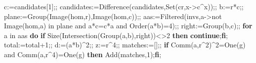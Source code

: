 \documentclass[
  10pt,
  letterpaper,
]{article}
\newenvironment{Shaded}{}{}
\newcommand{\BuiltInTok}[1]{\textcolor[rgb]{0.00,0.50,0.00}{#1}}
\newcommand{\ConstantTok}[1]{\textcolor[rgb]{0.53,0.00,0.00}{#1}}
\newcommand{\ControlFlowTok}[1]{\textcolor[rgb]{0.00,0.44,0.13}{\textbf{#1}}}
\newcommand{\ExtensionTok}[1]{#1}
\newcommand{\FloatTok}[1]{\textcolor[rgb]{0.25,0.63,0.44}{#1}}
\newcommand{\NormalTok}[1]{#1}
\newcommand{\OperatorTok}[1]{\textcolor[rgb]{0.40,0.40,0.40}{#1}}
\newcommand{\VariableTok}[1]{\textcolor[rgb]{0.10,0.09,0.49}{#1}}
\begin{document}
\begin{Shaded}
\begin{Highlighting}[]
   \VariableTok{c}\OperatorTok{:=}\VariableTok{candidates}\NormalTok{[}\FloatTok{1}\NormalTok{]}\OperatorTok{;;}
   \VariableTok{candidates}\OperatorTok{:=}\BuiltInTok{Difference}\NormalTok{(}\VariableTok{candidates}\OperatorTok{,}\BuiltInTok{Set}\NormalTok{(}\VariableTok{cr}\OperatorTok{,}\VariableTok{x}\OperatorTok{{-}\textgreater{}}\VariableTok{c}\OperatorTok{\^{}}\VariableTok{x}\NormalTok{))}\OperatorTok{;;}
   \VariableTok{b}\OperatorTok{:=}\VariableTok{r}\OperatorTok{*}\VariableTok{c}\OperatorTok{;;} \VariableTok{plane}\OperatorTok{:=}\BuiltInTok{Group}\NormalTok{(}\BuiltInTok{Image}\NormalTok{(}\VariableTok{hom}\OperatorTok{,}\VariableTok{r}\NormalTok{)}\OperatorTok{,}\BuiltInTok{Image}\NormalTok{(}\VariableTok{hom}\OperatorTok{,}\VariableTok{c}\NormalTok{))}\OperatorTok{;;}
   \VariableTok{aas}\OperatorTok{:=}\BuiltInTok{Filtered}\NormalTok{(}\VariableTok{invs}\OperatorTok{,}\VariableTok{a}\OperatorTok{{-}\textgreater{}}\ConstantTok{not} \BuiltInTok{Image}\NormalTok{(}\VariableTok{hom}\OperatorTok{,}\VariableTok{a}\NormalTok{) }\ExtensionTok{in} \VariableTok{plane} \ConstantTok{and} \VariableTok{a}\OperatorTok{*}\VariableTok{c}\OperatorTok{=}\VariableTok{c}\OperatorTok{*}\VariableTok{a} \ConstantTok{and} \BuiltInTok{Order}\NormalTok{(}\VariableTok{a}\OperatorTok{*}\VariableTok{b}\NormalTok{)}\OperatorTok{=}\FloatTok{4}\NormalTok{)}\OperatorTok{;;}
   \VariableTok{right}\OperatorTok{:=}\BuiltInTok{Group}\NormalTok{(}\VariableTok{b}\OperatorTok{,}\VariableTok{c}\NormalTok{)}\OperatorTok{;;}
   \ControlFlowTok{for} \VariableTok{a} \ExtensionTok{in} \VariableTok{aas} \ControlFlowTok{do}
    \ControlFlowTok{if} \BuiltInTok{Size}\NormalTok{(}\BuiltInTok{Intersection}\NormalTok{(}\BuiltInTok{Group}\NormalTok{(}\VariableTok{a}\OperatorTok{,}\VariableTok{b}\NormalTok{)}\OperatorTok{,}\VariableTok{right}\NormalTok{))}\OperatorTok{\textless{}\textgreater{}}\FloatTok{2} \ControlFlowTok{then} \ControlFlowTok{continue}\OperatorTok{;}\ControlFlowTok{fi}\OperatorTok{;}
    \VariableTok{total}\OperatorTok{:=}\VariableTok{total}\OperatorTok{+}\FloatTok{1}\OperatorTok{;;} \VariableTok{d}\OperatorTok{:=}\NormalTok{(}\VariableTok{a}\OperatorTok{*}\VariableTok{b}\NormalTok{)}\OperatorTok{\^{}}\FloatTok{2}\OperatorTok{;;} \VariableTok{z}\OperatorTok{:=}\VariableTok{r}\OperatorTok{\^{}}\FloatTok{4}\OperatorTok{;;}
    \VariableTok{matches}\OperatorTok{:=}\NormalTok{[]}\OperatorTok{;;}
    \ControlFlowTok{if} \BuiltInTok{Comm}\NormalTok{(}\VariableTok{a}\OperatorTok{,}\VariableTok{r}\OperatorTok{\^{}}\FloatTok{2}\NormalTok{)}\OperatorTok{\^{}}\FloatTok{2}\OperatorTok{=}\BuiltInTok{One}\NormalTok{(}\VariableTok{g}\NormalTok{) }\ConstantTok{and} \BuiltInTok{Comm}\NormalTok{(}\VariableTok{a}\OperatorTok{,}\VariableTok{r}\OperatorTok{\^{}}\FloatTok{4}\NormalTok{)}\OperatorTok{=}\BuiltInTok{One}\NormalTok{(}\VariableTok{g}\NormalTok{) }\ControlFlowTok{then} \BuiltInTok{Add}\NormalTok{(}\VariableTok{matches}\OperatorTok{,}\FloatTok{1}\NormalTok{)}\OperatorTok{;}\ControlFlowTok{fi}\OperatorTok{;}

\end{Highlighting}
\end{Shaded}
\end{document}
